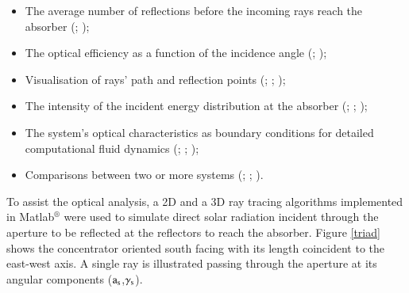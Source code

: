\begin{itemize}[topsep=5pt,partopsep=0pt] \itemsep0pt
	\item The average number of reflections before the incoming rays reach the absorber (\cite{Shams2013}; \cite{Benrejeb2016});
	\item The optical efficiency as a function of the incidence angle (\cite{Kothdiwala1996}; \cite{Souliotis2011});
	\item Visualisation of rays' path and reflection points (\cite{Mallick2007}; \cite{Ratismith2014}; \cite{Ustaoglu2016});
	\item The intensity of the incident energy distribution at the absorber (\cite{Sellami2013}; \cite{Ali2014}; \cite{Bellos2016});
	\item The system's optical characteristics as boundary conditions for detailed computational fluid dynamics (\cite{Mallick2007}; \cite{Shams2013}; \cite{Bellos2016});
	\item Comparisons between two or more systems (\cite{Zacharopoulos2000}; \cite{Sarmah2011}; \cite{Wu2009}).
\end{itemize}

To assist the optical analysis, a 2D and a 3D ray tracing algorithms implemented in Matlab$^{\circledR}$ were used to simulate direct solar radiation incident through the aperture to be reflected at the reflectors to reach the absorber. Figure \ref{triad} shows the concentrator oriented south facing with its length coincident to the east-west axis. A single ray is illustrated passing through the aperture at its angular components ($\rm{a_s}$,$\gamma_{\rm s}$). 


